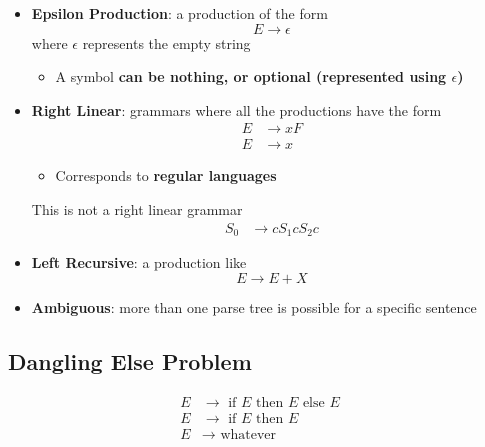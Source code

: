     \begin{itemize}
      \item \textbf{Epsilon Production}: a production of the form
      \begin{equation*}
        E \to \epsilon
      \end{equation*}
      where $ \epsilon $ represents the empty string

      \begin{itemize}
        \item A symbol \textbf{can be nothing, or optional (represented using
        $ \epsilon $)}
      \end{itemize}

      \item \textbf{Right Linear}: grammars where all the productions have the
      form
      \begin{align*}
        E &\to x F \\
        E &\to x
      \end{align*}

      \begin{itemize}
        \item Corresponds to \textbf{regular languages}
      \end{itemize}

      This is not a right linear grammar
      \begin{align*}
        S_{0} &\to c S_{1} c S_{2} c
      \end{align*}

      \item \textbf{Left Recursive}: a production like
      \begin{equation*}
        E \to E + X
      \end{equation*}

      \item \textbf{Ambiguous}: more than one parse tree is possible for a
      specific sentence
    \end{itemize}

  \subsection{Dangling Else Problem}

    \begin{align*}
      E &\to \text{ if } E \text{ then } E \text{ else } E \\
      E &\to \text{ if } E \text{ then } E \\
      E &\to \text{ whatever}
    \end{align*}


